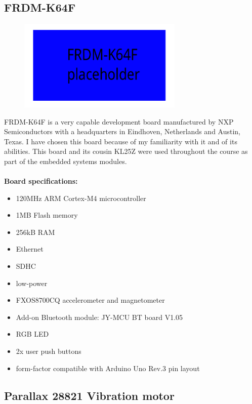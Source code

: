 \documentclass[12pt,a4paper]{article}
\begin{document}
		\subsection{FRDM-K64F}
		\begin{figure}[h]
			\centering
			\includegraphics[width=0.7\textwidth]{k64F_placeholder.png}\par\vspace{0cm}
		\end{figure}
		FRDM-K64F is a very capable development board manufactured by NXP Semiconductors with a 
		headquarters in Eindhoven, Netherlands and Austin, Texas. I have chosen this board because  
		of my familiarity with it and of its abilities. This board and its cousin KL25Z were used  
		throughout the course as part of the embedded systems modules.\\  	
		\\
		{\bfseries Board specifications:}  	
		\begin{itemize}
			\item 120MHz ARM Cortex-M4 microcontroller
			\item 1MB Flash memory
			\item 256kB RAM
			\item Ethernet
			\item SDHC
			\item low-power
			\item FXOS8700CQ accelerometer and magnetometer 
			\item Add-on Bluetooth module: JY-MCU BT board V1.05
			\item RGB LED
			\item 2x user push buttons
			\item form-factor compatible with Arduino Uno Rev.3 pin layout
		\end{itemize}
		\newpage
		
		\subsection{Parallax 28821 Vibration motor}
		
\end{document}

